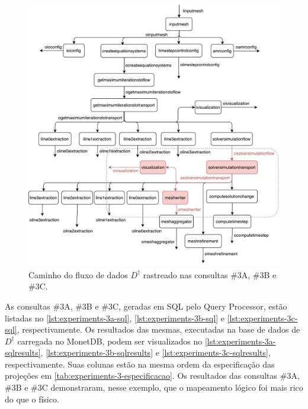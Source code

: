 \begin{figure}[htb]
    \centering
    \includegraphics[width=\textwidth]{img/experiments-dataflow-3}
    \caption[Caminho do fluxo de dados \(D^{\dagger}\) rastreado nas consultas \#3A, \#3B e \#3C]{Caminho do fluxo de dados \(D^{\dagger}\) rastreado nas consultas \#3A, \#3B e \#3C.}%
    \label{fig:experiments-dataflow-3}
\end{figure}

As consultas \#3A, \#3B e \#3C, geradas em SQL pelo Query Processor, estão listadas no \autoref{lst:experiments-3a-sql}, \autoref{lst:experiments-3b-sql} e \autoref{lst:experiments-3c-sql}, respectivamente. Os resultados das mesmas, executadas na base de dados de \(D^{\dagger}\) carregada no MonetDB, podem ser visualizados no \autoref{lst:experiments-3a-sqlresults}, \autoref{lst:experiments-3b-sqlresults} e \autoref{lst:experiments-3c-sqlresults}, respectivamente. Suas colunas estão na mesma ordem da especificação das projeções em \autoref{tab:experiments-3-especificacao}. Os resultados das consultas \#3A, \#3B e \#3C demonstraram, nesse exemplo, que o mapeamento lógico foi mais rico do que o físico.

